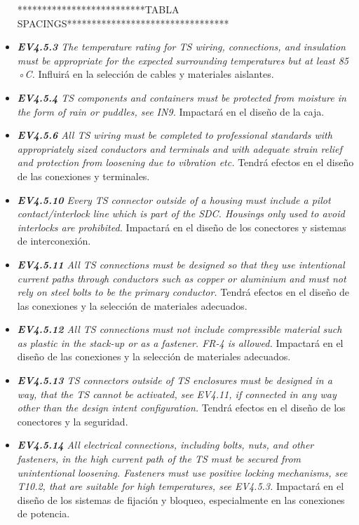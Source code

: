 \begin{itemize}
    **************************TABLA SPACINGS*********************************

    \item \textit{\textbf{EV4.5.3} The temperature rating for TS wiring, connections, and insulation must be appropriate for the expected surrounding temperatures but at least 85 ◦C.} Influirá en la selección de cables y materiales aislantes.
    \item \textit{\textbf{EV4.5.4} TS components and containers must be protected from moisture in the form of rain or puddles, see IN9.} Impactará en el diseño de la caja.
    \item \textit{\textbf{EV4.5.6} All TS wiring must be completed to professional standards with appropriately sized conductors and terminals and with adequate strain relief and protection from loosening due to vibration etc.} Tendrá efectos en el diseño de las conexiones y terminales.
    \item \textit{\textbf{EV4.5.10} Every TS connector outside of a housing must include a pilot contact/interlock line which is part of the SDC. Housings only used to avoid interlocks are prohibited.} Impactará en el diseño de los conectores y sistemas de interconexión.
    \item \textit{\textbf{EV4.5.11} All TS connections must be designed so that they use intentional current paths through conductors such as copper or aluminium and must not rely on steel bolts to be the primary conductor.} Tendrá efectos en el diseño de las conexiones y la selección de materiales adecuados.
    \item \textit{\textbf{EV4.5.12} All TS connections must not include compressible material such as plastic in the stack-up or as a fastener. FR-4 is allowed.} Impactará en el diseño de las conexiones y la selección de materiales adecuados.
    \item \textit{\textbf{EV4.5.13} TS connectors outside of TS enclosures must be designed in a way, that the TS cannot be activated, see EV4.11, if connected in any way other than the design intent configuration.} Tendrá efectos en el diseño de los conectores y la seguridad.
    \item \textit{\textbf{EV4.5.14} All electrical connections, including bolts, nuts, and other fasteners, in the high current path of the TS must be secured from unintentional loosening. Fasteners must use positive locking mechanisms, see T10.2, that are suitable  for high temperatures, see EV4.5.3.} Impactará en el diseño de los sistemas de fijación y bloqueo, especialmente en las conexiones de potencia.

\end{itemize}
